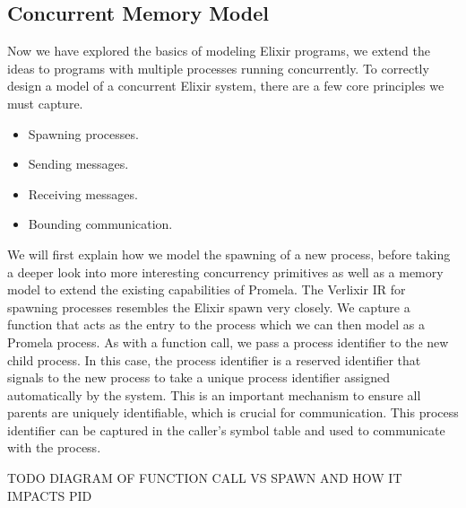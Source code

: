 \subsection{Concurrent Memory Model} \label{sec:memory_model}
Now we have explored the basics of modeling Elixir programs, we extend the ideas to programs with multiple processes running concurrently. To correctly design a model of a concurrent Elixir system, there are a few core principles we must capture.
\begin{itemize}
    \item Spawning processes.
    \item Sending messages.
    \item Receiving messages.
    \item Bounding communication.
\end{itemize}
We will first explain how we model the spawning of a new process, before taking a deeper look into more interesting concurrency primitives as well as a memory model to extend the existing capabilities of Promela. The Verlixir IR for spawning processes resembles the Elixir spawn very closely. We capture a function that acts as the entry to the process which we can then model as a Promela process. As with a function call, we pass a process identifier to the new child process. In this case, the process identifier is a reserved identifier that signals to the new process to take a unique process identifier assigned automatically by the system. This is an important mechanism to ensure all parents are uniquely identifiable, which is crucial for communication. This process identifier can be captured in the caller's symbol table and used to communicate with the process.
\par
TODO DIAGRAM OF FUNCTION CALL VS SPAWN AND HOW IT IMPACTS PID
\par

